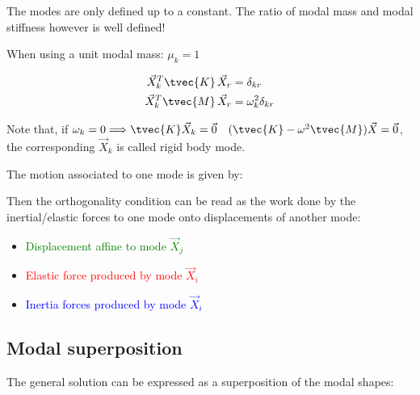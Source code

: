 \documentclass[10pt,a4paper]{scrartcl}
\begin{document}
\begin{multicols*}{2}
The modes are only defined up to a constant. The ratio of modal mass and modal stiffness however is well defined!


When using a unit modal mass: $\mu_k = 1$

\begin{align*}
\vec{X}_k^T\tvec{K}\,\vec{X}_r &= \delta_{kr}\\
\vec{X}_k^T\tvec{M}\,\vec{X}_r&=\omega_k^2\delta_{kr}
\end{align*}

Note that, if $\omega_k = 0\Longrightarrow \tvec{K}\vec{X}_k=\vec{0}\quad (\tvec{K}-\omega^2\tvec{M})\vec{X}=\vec{0}$, the corresponding $\vec{X}_k$ is called rigid body mode.

The motion associated to one mode is given by:


Then the orthogonality condition can be read as the work done by the inertial/elastic forces to one mode onto displacements of another mode:


\begin{itemize}
\item \textcolor{green}{Displacement affine to mode $\vec{X}_j$}
\item \textcolor{red}{Elastic force produced by mode $\vec{X}_i$}
\item \textcolor{blue}{Inertia forces produced by mode $\vec{X}_i$}
\end{itemize}

\subsection{Modal superposition}


The general solution can be expressed as a superposition of the modal shapes:



\end{multicols*}
\end{document}
